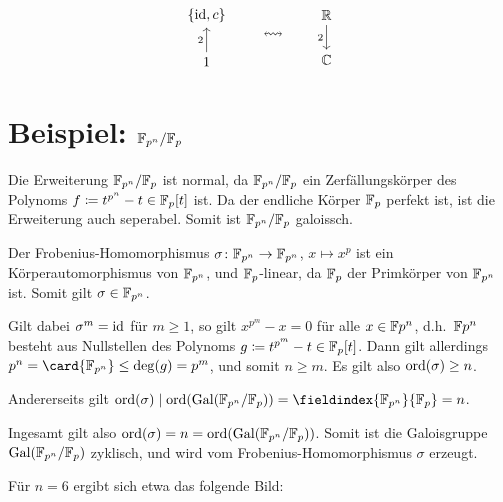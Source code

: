 \[
  \begin{tikzcd}
      \{\id, c\}
    \\
      1
      \arrow{u}[left]{2}
  \end{tikzcd}
  \qquad
  \leftrightsquigarrow
  \qquad
  \begin{tikzcd}
      \Real
      \arrow{d}[left]{2}
    \\
      \Complex
  \end{tikzcd}
\]





\section{Beispiel: \texorpdfstring{$\mathbb{F}_{p^n}/\mathbb{F}_p$}{F\_(pn)/F\_p}}

Die Erweiterung $\mathbb{F}_{p^n}/\mathbb{F}_p$ ist normal, da $\mathbb{F}_{p^n}/\mathbb{F}_p$ ein Zerfällungskörper des Polynoms $f \coloneqq t^{p^n} - t \in \mathbb{F}_p[t]$ ist.
Da der endliche Körper $\mathbb{F}_p$ perfekt ist, ist die Erweiterung auch seperabel.
Somit ist $\mathbb{F}_{p^n}/\mathbb{F}_p$ galoissch.

Der Frobenius-Homomorphismus $\sigma \colon \mathbb{F}_{p^n} \to \mathbb{F}_{p^n}$, $x \mapsto x^p$ ist ein Körperautomorphismus von $\mathbb{F}_{p^n}$, und $\mathbb{F}_p$-linear, da $\mathbb{F}_p$ der Primkörper von $\mathbb{F}_{p^n}$ ist.
Somit gilt $\sigma \in \mathbb{F}_{p^n}$.

Gilt dabei $\sigma^m = \operatorname{id}$ für $m \geq 1$, so gilt $x^{p^m} - x = 0$ für alle $x \in \mathbb{F}{p^n}$, d.h.\ $\mathbb{F}{p^n}$ besteht aus Nullstellen des Polynoms $g \coloneqq t^{p^m} - t \in \mathbb{F}_p[t]$.
Dann gilt allerdings $p^n = \card{\Finite_{p^n}} \leq \deg(g) = p^m$, und somit $n \geq m$.
Es gilt also $\operatorname{ord}(\sigma) \geq n$.

Andererseits gilt $\ord{\sigma} \divides \ord{ \Gal{\Finite_{p^n}/\Finite_p} } = \fieldindex{\Finite_{p^n}}{\Finite_p} = n$.

Ingesamt gilt also $\operatorname{ord}(\sigma) = n = \operatorname{ord}( \operatorname{Gal}(\mathbb{F}_{p^n}/\mathbb{F}_p) )$.
Somit ist die Galoisgruppe $\operatorname{Gal}(\mathbb{F}_{p^n}/\mathbb{F}_p)$ zyklisch, und wird vom Frobenius-Homomorphismus $\sigma$ erzeugt.

Für $n = 6$ ergibt sich etwa das folgende Bild:

